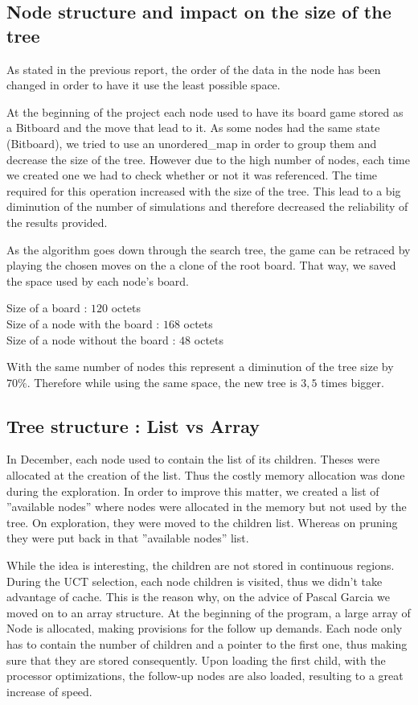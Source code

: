 \subsection{Node structure and impact on the size of the tree}

As stated in the previous report, the order of the data in the node has been changed in order to have it use the least possible space.

At the beginning of the project each node used to have its board game stored as a Bitboard and the move that lead to it. As some nodes had the same state (Bitboard), we tried to use an unordered\_map in order to group them and decrease the size of the tree. However due to the high number of nodes, each time we created one we had to check whether or not it was referenced. The time required for this operation increased with the size of the tree. This lead to a big diminution of the number of simulations and therefore decreased the reliability of the results provided.

As the algorithm goes down through the search tree, the game can be retraced by playing the chosen moves on the a clone of the root board. That way, we saved the space used by each node's board.

\noindent
Size of a board : $120$ octets\\
Size of a node with the board : $168$ octets\\
Size of a node without the board : $48$ octets

With the same number of nodes this represent a diminution of the tree size by $70\%$. Therefore while using the same space, the new tree is $3,5$ times bigger.

\subsection{Tree structure : List vs Array}

In December, each node used to contain the list of its children. Theses were allocated at the creation of the list. Thus the costly memory allocation was done during the exploration.
In order to improve this matter, we created a list of ''available nodes'' where nodes were allocated in the memory but not used by the tree. On exploration, they were moved to the children list. Whereas on pruning they were put back in that ''available nodes'' list.

While the idea is interesting, the children are not stored in continuous regions. During the UCT selection, each node children is visited, thus we didn't take advantage of cache. This is the reason why, on the advice of Pascal Garcia we moved on to an array structure. At the beginning of the program, a large array of Node is allocated, making provisions for the follow up demands. Each node only has to contain the number of children and a pointer to the first one, thus making sure that they are stored consequently. Upon loading the first child, with the processor optimizations, the follow-up nodes are also loaded, resulting to a great increase of speed.

